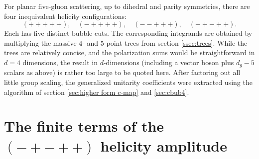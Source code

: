 \documentclass[11pt]{article}
\newcommand{\be}{\begin{equation}}
\newcommand{\ee}{\end{equation}}
\newcommand{\la}{\langle}
\newcommand{\ra}{\rangle}
\newcommand{\trfive}{{\text{tr}_5}}
\begin{document}

For planar five-gluon scattering, up to dihedral and parity symmetries, there are four inequivalent helicity configurations:
\be
(+++++),\quad
(-++++),\quad
(--+++),\quad
(-+-++).
\ee
Each has five distinct bubble cuts.
The corresponding integrands are obtained by multiplying the massive 4- and 5-point trees from section
\ref{ssec:trees}. While the trees are relatively concise, and the polarization sums would be straightforward in $d=4$ dimensions,
the result in $d$-dimensions (including a vector boson plus $d_g-5$ scalars as above) is rather too large to be quoted here.
After factoring out all little group scaling, the generalized unitarity coefficients were extracted using the algorithm of section \ref{sec:higher form c-map} and \ref{sec:cbub4}. 





\section{The finite terms of the $(-+-++)$ helicity amplitude \label{app:-+-++}}
\end{document}
